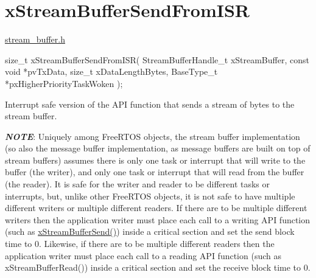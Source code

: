 \hypertarget{group__x_stream_buffer_send_from_i_s_r}{}\section{x\+Stream\+Buffer\+Send\+From\+I\+SR}
\label{group__x_stream_buffer_send_from_i_s_r}
\hyperlink{stream__buffer_8h}{stream\+\_\+buffer.\+h}


\begin{DoxyPre}
size\_t xStreamBufferSendFromISR( StreamBufferHandle\_t xStreamBuffer,
                                 const void *pvTxData,
                                 size\_t xDataLengthBytes,
                                 BaseType\_t *pxHigherPriorityTaskWoken );

\begin{DoxyPre}\end{DoxyPre}
\end{DoxyPre}



\begin{DoxyPre}
\begin{DoxyPre}   Interrupt safe version of the API function that sends a stream of bytes to
   the stream buffer.\end{DoxyPre}
\end{DoxyPre}



\begin{DoxyPre}
\begin{DoxyPre}   {\itshape {\bfseries NOTE}}:  Uniquely among FreeRTOS objects, the stream buffer
   implementation (so also the message buffer implementation, as message buffers
   are built on top of stream buffers) assumes there is only one task or
   interrupt that will write to the buffer (the writer), and only one task or
   interrupt that will read from the buffer (the reader).  It is safe for the
   writer and reader to be different tasks or interrupts, but, unlike other
   FreeRTOS objects, it is not safe to have multiple different writers or
   multiple different readers.  If there are to be multiple different writers
   then the application writer must place each call to a writing API function
   (such as \hyperlink{stream__buffer_8h_a35cdf3b6bf677086b9128782f762499d}{xStreamBufferSend()}) inside a critical section and set the send
   block time to 0.  Likewise, if there are to be multiple different readers
   then the application writer must place each call to a reading API function
   (such as xStreamBufferRead()) inside a critical section and set the receive
   block time to 0.\end{DoxyPre}
\end{DoxyPre}



